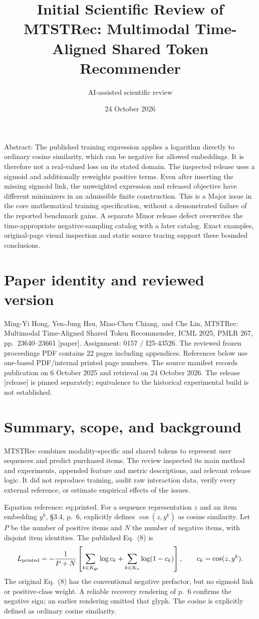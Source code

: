 \documentclass[10pt]{article}
\title{Initial Scientific Review of
MTSTRec: Multimodal Time-Aligned Shared Token Recommender}
\author{AI-assisted scientific review}
\date{24 October 2026}
\begin{document}
\maketitle
Abstract: The published training expression applies a logarithm directly to ordinary cosine similarity, which can be negative for allowed embeddings. It is therefore not a real-valued loss on its stated domain. The inspected release uses a sigmoid and additionally reweights positive terms. Even after inserting the missing sigmoid link, the unweighted expression and released objective have different minimizers in an admissible finite construction. This is a Major issue in the core mathematical training specification, without a demonstrated failure of the reported benchmark gains. A separate Minor release defect overwrites the time-appropriate negative-sampling catalog with a later catalog. Exact examples, original-page visual inspection and static source tracing support these bounded conclusions.\par
\section*{Paper identity and reviewed version}
Ming-Yi Hong, Yen-Jung Hsu, Miao-Chen Chiang, and Che Lin, MTSTRec: Multimodal Time-Aligned Shared Token Recommender, ICML 2025, PMLR 267, pp. 23640–23661 [paper]. Assignment: 0157 / I25-43526. The reviewed frozen proceedings PDF contains 22 pages including appendices. References below use one-based PDF/internal printed page numbers. The source manifest records publication on 6 October 2025 and retrieval on 24 October 2026. The release [release] is pinned separately; equivalence to the historical experimental build is not established.\par
\section*{Summary, scope, and background}
MTSTRec combines modality-specific and shared tokens to represent user sequences and predict purchased items. The review inspected its main method and experiments, appended feature and metric descriptions, and relevant release logic. It did not reproduce training, audit raw interaction data, verify every external reference, or estimate empirical effects of the issues.\par
Equation reference: eq:printed. For a sequence representation \(z\) and an item embedding \(y^k\), §3.4, p. 6, explicitly defines \(\cos(z,y^k)\) as cosine similarity. Let \(P\) be the number of positive items and \(N\) the number of negative items, with disjoint item identities. The published Eq. (8) is \[
L_{\rm printed}=-\frac{1}{P+N}
 \left[\sum_{k\in K_{\rm gt}}\log c_k+
       \sum_{k\in K_n}\log(1-c_k)\right],
\qquad c_k=\cos(z,y^k).\] The original Eq. (8) has the conventional negative prefactor, but no sigmoid link or positive-class weight. A reliable recovery rendering of p. 6 confirms the negative sign; an earlier rendering omitted that glyph. The cosine is explicitly defined as ordinary cosine similarity.\par
\end{document}
